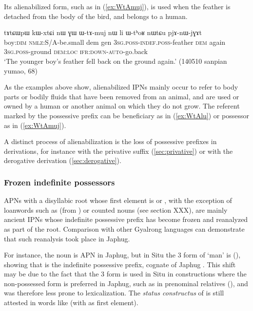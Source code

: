 Its alienabilized form, such as  in (\ref{ex:WtAmuj}), is used when the feather is detached from the body of the bird, and belongs to a human.
  
\begin{exe}
\ex \label{ex:WtAmuj}
 \gll tɤtɕɯpɯ kɯ-xtɕi nɯ ɣɯ ɯ-tɤ-muj nɯ li ɯ-tʰoʁ nɯtɕu pjɤ-nɯ-jɣɤt  \\
 boy:\textsc{dim} \textsc{nmlz}:S/A-be.small dem gen \textsc{3sg.poss}-\textsc{indef.poss}-feather \textsc{dem} again \textsc{3sg.poss}-ground \textsc{dem:loc} \textsc{ifr}:\textsc{down}-\textsc{auto}-go.back  \\
 \glt `The younger boy's feather fell back on the ground again.' (140510 sanpian yumao, 68)
\end{exe}
 
As the examples above show, alienabilized IPNs mainly occur to refer to body parts or bodily fluids that have been removed from an animal, and are used or owned by a human or another animal on which they do not grow. The referent marked by the possessive prefix can be beneficiary as in (\ref{ex:WtAlu}) or possessor as in (\ref{ex:WtAmuj}).
 
 A distinct process of alienabilization is the loss of possessive prefixes in derivations, for instance with the privative suffix (\ref{sec:privative}) or with the derogative derivation (\ref{sec:derogative}).
 
\subsubsection{Frozen indefinite possessors} \label{sec:frozen.indef}
APNs with a disyllabic root whose first element is  or , with the exception of loanwords such as  (from ) or counted nouns (see section XXX), are mainly ancient IPNs whose indefinite possessive prefix  has become frozen and reanalyzed as part of the root. Comparison with other Gyalrong languages can demonstrate that such reanalysis took place in Japhug.

For instance, the noun  is APN in Japhug, but in Situ the 3\sg{} form of  `man' is   (\citealt[183;197]{lin09phd}), showing that  is the indefinite possessive prefix, cognate of Japhug . This shift may be due to the fact that the 3\sg{} form is used in Situ in constructions where the non-possessed form is preferred in Japhug, such as in prenominal relatives (\citealt[190]{lin09phd}), and was therefore less prone to lexicalization. The \textit{status constructus}  of   is still attested in words like  (with  as first element).

